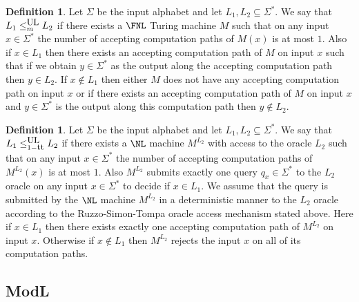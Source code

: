 \documentclass{amsbook}
\theoremstyle{definition}
\newtheorem{definition}[theorem]{Definition}
\theoremstyle{remark}
\numberwithin{section}{chapter}
\numberwithin{equation}{chapter}
\newcommand{\ULredn}{\mbox{\small{\rm UL}}}
\newcommand{\trt}{\mbox{\small{\rm tt}}}
\begin{document}
\begin{definition}\label{ulmanyonedefn}
Let $\Sigma$ be the input alphabet and let $L_1,L_2\subseteq\Sigma ^{*}$. We say that $L_1\leq ^{\ULredn}_mL_2$ if there exists a $\FNL$ Turing machine $M$ such that on any input $x\in\Sigma ^{*}$ the number of accepting computation paths of $M(x)$ is at most $1$. Also if $x\in L_1$ then there exists an accepting computation path of $M$ on input $x$ such that if we obtain $y\in\Sigma^{*}$ as the output along the accepting computation path then $y\in L_2$. If $x\not\in L_1$ then either $M$ does not have any accepting computation path on input $x$ or if there exists an accepting computation path of $M$ on input $x$ and $y\in\Sigma^{*}$ is the output along this computation path then $y\not\in L_2$.
\end{definition}
\begin{definition}\label{ul1ttdefn}
Let $\Sigma$ be the input alphabet and let $L_1,L_2\subseteq\Sigma ^{*}$. We say that $L_1\leq ^{\ULredn}_{1-\trt}L_2$ if there exists a $\NL$ machine $M^{L_2}$ with access to the oracle $L_2$ such that on any input $x\in\Sigma ^{*}$ the number of accepting computation paths of $M^{L_2}(x)$ is at most $1$. Also $M^{L_2}$ submits exactly one query $q_x\in\Sigma^{*}$ to the $L_2$ oracle on any input $x\in\Sigma^{*}$ to decide if $x\in L_1$.  We assume that the query is submitted by the $\NL$ machine $M^{L_2}$ in a deterministic manner to the $L_2$ oracle according to the Ruzzo-Simon-Tompa oracle access mechanism stated above. Here if $x\in L_1$ then there exists exactly one accepting computation path of $M^{L_2}$ on input $x$. Otherwise if $x\not\in L_1$ then $M^{L_2}$ rejects the input $x$ on all of its computation paths.
\end{definition}

\subsection{\textrm{ModL}}
\end{document}
